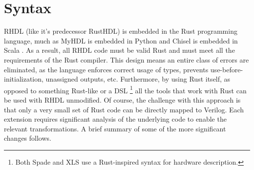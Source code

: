\documentclass[sigplan,screen,sigconf]{acmart}
\begin{document}
\section{Syntax}
RHDL (like it's predecessor RustHDL) is embedded in the Rust programming language, much as 
MyHDL is embedded in Python\cite{b3} and Chisel is embedded in Scala \cite{b2}.  As a result,
all RHDL code must be valid Rust and must meet all the requirements of the Rust compiler.  This design means an entire class of errors are eliminated, as the language enforces correct usage of types, prevents use-before-initialization, unassigned outputs, etc.  Furthermore, by using Rust itself, as opposed to something Rust-like or a DSL \footnote{Both Spade \cite{b1} and XLS \cite{b4} use a Rust-inspired syntax for hardware description.} all the tools that work with Rust can be used with RHDL unmodified.  Of course, the challenge with this approach is that only a very small set of Rust code can be directly mapped to Verilog.  Each extension requires significant analysis of the underlying code to enable the relevant transformations.  A brief summary of some of the more significant changes follows.
\end{document}
